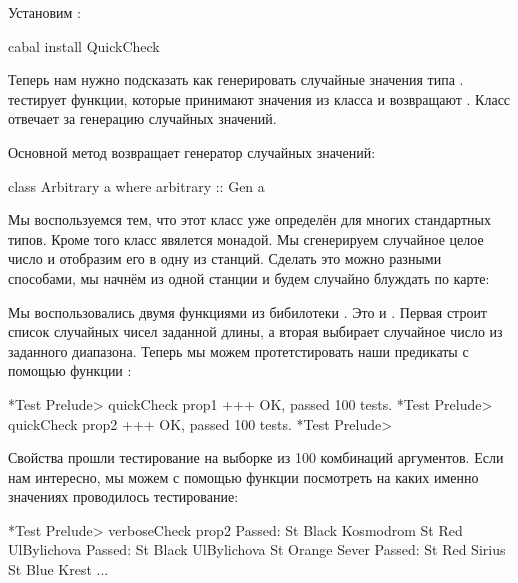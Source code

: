 Установим :


\begin{code}
cabal install QuickCheck
\end{code}

Теперь нам нужно подсказать  как генерировать случайные
значения типа .  тестирует функции, которые
принимают значения из класса  и возвращают .
Класс  отвечает за генерацию случайных значений.

Основной метод  возвращает генератор случайных значений:


\begin{code}
class Arbitrary a where
    arbitrary :: Gen a
\end{code}

Мы воспользуемся тем, что этот класс уже определён для многих
стандартных типов. Кроме того класс  явялется монадой. Мы
сгенерируем случайное целое число и отобразим его в одну из станций.
Сделать это можно разными способами, мы начнём из одной станции и будем
случайно блуждать по карте:



Мы воспользовались двумя функциями из бибилотеки . Это
 и . Первая строит список случайных чисел заданной
длины, а вторая выбирает случайное число из заданного диапазона. Теперь
мы можем протетстировать наши предикаты с помощью функции
:


\begin{code}
*Test Prelude> quickCheck prop1
+++ OK, passed 100 tests.
*Test Prelude> quickCheck prop2
+++ OK, passed 100 tests.
*Test Prelude> 
\end{code}

Свойства прошли тестирование на выборке из 100 комбинаций аргументов.
Если нам интересно, мы можем с помощью функции 
посмотреть на каких именно значениях проводилось тестирование:


\begin{code}
*Test Prelude> verboseCheck prop2
Passed:  
St Black Kosmodrom
St Red UlBylichova
Passed: 
St Black UlBylichova
St Orange Sever
Passed:  
St Red Sirius
St Blue Krest
...
\end{code}

